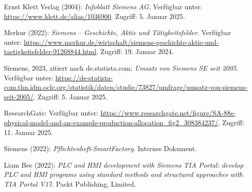 
\begin{thebibliography}{}

Ernst Klett Verlag (2004): \textit{Infoblatt Siemens AG}. Verfügbar unter: \url{https://www.klett.de/alias/1036900}. Zugriff: 5. Januar 2025.

Merkur (2022): \textit{Siemens – Geschichte, Aktie und Tätigkeitsfelder}. Verfügbar unter: \url{https://www.merkur.de/wirtschaft/siemens-geschichte-aktie-und-taetigkeitsfelder-91268844.html}. Zugriff: 19. Januar 2024.

Siemens, 2023, zitiert nach de.statista.com: \textit{Umsatz von Siemens SE seit 2005}. Verfügbar unter: \url{https://de-statista-com.thn.idm.oclc.org/statistik/daten/studie/73827/umfrage/umsatz-von-siemens-seit-2005/}. Zugriff: 5. Januar 2025.

ResearchGate: Verfügbar unter: \url{https://www.researchgate.net/figure/SA-88s-physical-model-and-an-example-production-allocation_fig2_308384237/}. Zugriff: 11. Januar 2025.

Siemens (2022): \textit{Pflichtenheft-SmartFactory}. Internes Dokument.

Liam Bee (2022): \textit{PLC and HMI development with Siemens TIA Portal: develop PLC and HMI programs using standard methods and structured approaches with TIA Portal V17}. Packt Publishing, Limited. 

\end{thebibliography}
